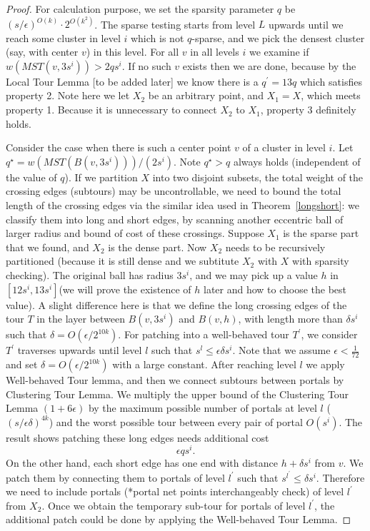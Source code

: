 \documentclass{llncs}
\begin{document}
\begin{proof}
For calculation purpose, we set the sparsity parameter $q$ be $(s/\epsilon)^{O(k)}\cdot 2^{O(k^2)}$.
The sparse testing starts from level $L$ upwards until we reach some cluster in level $i$ which is not $q$-sparse, and we pick the densest cluster (say, with center $v$) in this level.
For all $v$ in all levels $i$ we examine if $w(MST(v,3s^i)) > 2qs^i$.
If no such $v$ exists then we are done, because by the Local Tour Lemma [to be added later] we know there is a $q^\prime=13q$ which satisfies property 2.
Note here we let $X_2$ be an arbitrary point, and $X_1=X$, which meets property 1.
Because it is unnecessary to connect $X_2$ to $X_1$, property 3 definitely holds.

Consider the case when there is such a center point $v$ of a cluster in level $i$.
Let $q^\star=w(MST(B(v,3s^i)))/(2s^i)$.
Note $q^\star>q$ always holds (independent of the value of $q$).
If we partition $X$ into two disjoint subsets, the total weight of the crossing edges (subtours) may be uncontrollable, we need to bound the total length of the crossing edges via the similar idea used in Theorem~\ref{longshort}: we classify them into long and short edges, by scanning another eccentric ball of larger radius and bound of cost of these crossings.
Suppose $X_1$ is the sparse part that we found, and $X_2$ is the dense part.
Now $X_2$ needs to be recursively partitioned (because it is still dense and we subtitute $X_2$ with $X$ with sparsity checking).
The original ball has radius $3s^i$, and we may pick up a value $h$ in $[12s^i, 13s^i]$(we will prove the existence of $h$ later and how to choose the best value).
A slight difference here is that we define the long crossing edges of the tour $T$ in the layer between $B(v,3s^i)$ and $B(v,h)$, with length more than $\delta s^i$ such that $\delta=O(\epsilon/2^{10k})$.
For patching into a well-behaved tour $T^\prime$, we consider $T^\prime$ traverses upwards until level $l$ such that $s^l\leq \epsilon\delta s^i$.
Note that we assume $\epsilon<\frac{1}{72}$ and set $\delta=O(\epsilon/2^{10k})$ with a large constant.
After reaching level $l$ we apply Well-behaved Tour lemma, and then we connect subtours between portals by Clustering Tour Lemma.
We multiply the upper bound of the Clustering Tour Lemma $(1+6\epsilon)$ by the maximum possible number of portals at level $l$ ($(s/\epsilon\delta)^{4k}$) and the worst possible tour between every pair of portal $O(s^i)$.
The result shows patching these long edges needs additional cost
\begin{equation}
\epsilon q s^i. 
\end{equation}
On the other hand, each short edge has one end with distance $h+\delta s^i$ from $v$.
We patch them by connecting them to portals of level $l^\prime$ such that $s^{l^\prime}\leq\delta s^i$.
Therefore we need to include portals (*portal net points interchangeably check) of level $l^\prime$ from $X_2$.
Once we obtain the temporary sub-tour for portals of level $l^\prime$, the additional patch could be done by applying the Well-behaved Tour Lemma.


\end{proof}
\end{document}
